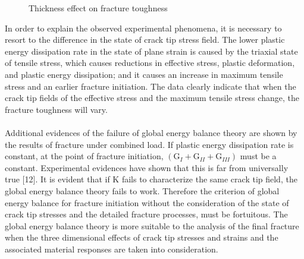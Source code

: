 \documentclass[12pt]{article}
\begin{document}
\begin{figure}[H]
    \centering
    \captionsetup{labelformat=empty}
    \caption{Thickness effect on fracture toughness}
\end{figure}
In order to explain the observed experimental phenomena, it is necessary to resort to the difference
in the state of crack tip stress field. The lower plastic energy dissipation rate in the state of plane strain is
caused by the triaxial state of tensile stress, which causes reductions in effective stress, plastic
deformation, and plastic energy dissipation; and it causes an increase in maximum tensile stress and an
earlier fracture initiation. The data clearly indicate that when the crack tip fields of the effective stress
and the maximum tensile stress change, the fracture toughness will vary.\\\\
Additional evidences of the failure of global energy balance theory are shown by the results of
fracture under combined load. If plastic energy dissipation rate is constant, at the point of fracture
initiation, $(\text{G}_{I} + \text{G}_{II} + \text{G}_{III})$ must be a constant. Experimental evidences have shown that this is far from
universally true [12]. It is evident that if K fails to characterize the same crack tip field, the global energy
balance theory fails to work. Therefore the criterion of global energy balance for fracture initiation
without the consideration of the state of crack tip stresses and the detailed fracture processes, must be
fortuitous. The global energy balance theory is more suitable to the analysis of the final fracture when
the three dimensional effects of crack tip stresses and strains and the associated material responses are
taken into consideration.
\end{document}
